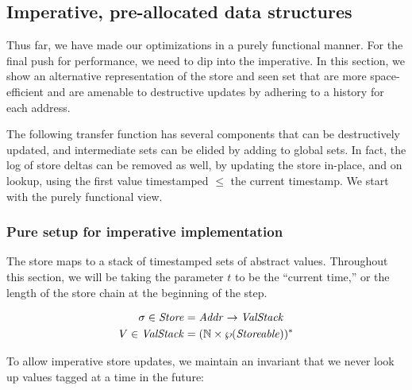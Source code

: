 \documentclass[preprint,onecolumn,9pt]{sigplanconf} %
\begin{document}


\subsection{Imperative, pre-allocated data structures}

Thus far, we have made our optimizations in a purely functional
manner. For the final push for performance, we need to dip into the
imperative. In this section, we show an alternative representation of
the store and seen set that are more space-efficient and are amenable
to destructive updates by adhering to a history for each address.

The following transfer function has several components that can be
destructively updated, and intermediate sets can be elided by adding
to global sets. In fact, the log of store deltas can be removed as
well, by updating the store in-place, and on lookup, using the first
value timestamped $\le$ the current timestamp. We start with the
purely functional view.

\subsubsection{Pure setup for imperative implementation}

The store maps to a stack of timestamped sets of abstract
values. Throughout this section, we will be taking the parameter $t$
to be the ``current time,'' or the length of the store chain at the
beginning of the step.

\begin{align*}
\sigma \in \mathit{Store} &= \mathit{Addr} \to \mathit{ValStack} \\
V \in \mathit{ValStack} &= ({\mathbb N} \times \wp(\mathit{Storeable}))^*
\end{align*}

To allow imperative store updates, we maintain an invariant that we never look up values tagged at a time in the future:
\end{document}
